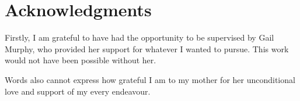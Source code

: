
\chapter{Acknowledgments}

Firstly, I am grateful to have had the opportunity to be supervised by Gail Murphy,
who provided her support for whatever I wanted to pursue.
This work would not have been possible without her.

Words also cannot express how grateful I am to my mother for her
unconditional love and support of my every endeavour.